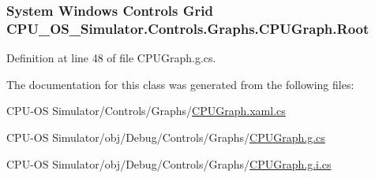 \subsubsection[{Root}]{\setlength{\rightskip}{0pt plus 5cm}System Windows Controls Grid C\+P\+U\+\_\+\+O\+S\+\_\+\+Simulator.\+Controls.\+Graphs.\+C\+P\+U\+Graph.\+Root\hspace{0.3cm}{\ttfamily [package]}}\label{class_c_p_u___o_s___simulator_1_1_controls_1_1_graphs_1_1_c_p_u_graph_af9993709cdbe673f572a3dc4562293a6}


Definition at line 48 of file C\+P\+U\+Graph.\+g.\+cs.



The documentation for this class was generated from the following files\+:\begin{DoxyCompactItemize}
\item 
C\+P\+U-\/\+O\+S Simulator/\+Controls/\+Graphs/\hyperlink{_c_p_u_graph_8xaml_8cs}{C\+P\+U\+Graph.\+xaml.\+cs}\item 
C\+P\+U-\/\+O\+S Simulator/obj/\+Debug/\+Controls/\+Graphs/\hyperlink{_c_p_u_graph_8g_8cs}{C\+P\+U\+Graph.\+g.\+cs}\item 
C\+P\+U-\/\+O\+S Simulator/obj/\+Debug/\+Controls/\+Graphs/\hyperlink{_c_p_u_graph_8g_8i_8cs}{C\+P\+U\+Graph.\+g.\+i.\+cs}\end{DoxyCompactItemize}
